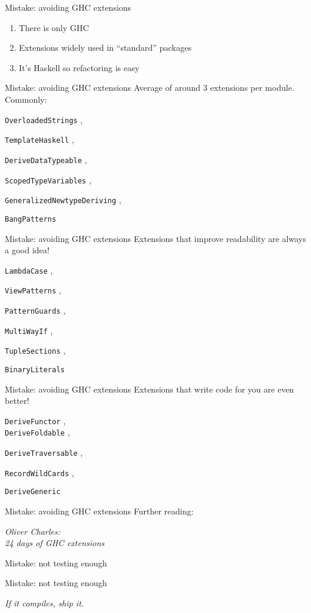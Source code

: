 \documentclass[20pt]{beamer}
\newcommand{\vspaced}{
    \vspace{5mm}
}
\newcommand{\chapterslide}[1]{
    {
        \begin{frame}[plain]
        \begin{center}
        \large{#1}
        \end{center}
        \end{frame}
    }
}
\newcommand{\code}[1]{
    \texttt{\small{#1}}
}
\begin{document}
\begin{frame}{Mistake: avoiding GHC extensions}
    \begin{enumerate}
    \item There is only GHC
    \item Extensions widely used in ``standard'' packages
    \item It's Haskell so refactoring is easy
    \end{enumerate}
\end{frame}

\begin{frame}{Mistake: avoiding GHC extensions}
    Average of around 3 extensions per module. Commonly:
    \code{OverloadedStrings},
    \code{TemplateHaskell},
    \code{DeriveDataTypeable},
    \code{ScopedTypeVariables},
    \code{GeneralizedNewtypeDeriving},
    \code{BangPatterns}
\end{frame}

\begin{frame}{Mistake: avoiding GHC extensions}
    Extensions that improve readability are always a good idea! \\
    \vspaced
    \code{LambdaCase},
    \code{ViewPatterns},
    \code{PatternGuards},
    \code{MultiWayIf},
    \code{TupleSections},
    \code{BinaryLiterals}
\end{frame}

\begin{frame}{Mistake: avoiding GHC extensions}
    Extensions that write code for you are even better! \\
    \vspaced
    \code{DeriveFunctor}, \\
    \code{DeriveFoldable},
    \code{DeriveTraversable},
    \code{RecordWildCards},
    \code{DeriveGeneric}
\end{frame}

\begin{frame}{Mistake: avoiding GHC extensions}
    Further reading: \\
    \vspaced
    \emph{Oliver Charles: \\
    24 days of GHC extensions}
\end{frame}


\chapterslide{Mistake: not testing enough}

\begin{frame}{Mistake: not testing enough}
    \begin{center}
    \emph{If it compiles, ship it.}
    \end{center}
\end{frame}
\end{document}
